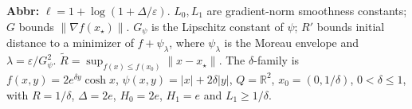 \begin{table}[tp]
\begin{threeparttable}
\begin{tabularx}{\linewidth}{@{}>{\raggedright\arraybackslash}p{0.20\linewidth}>{\raggedright\arraybackslash}p{0.32\linewidth}>{\raggedright\arraybackslash}p{0.25\linewidth}>{\raggedright\arraybackslash}X@{}}
\bottomrule
\end{tabularx}
\begin{tablenotes}[flushleft]\footnotesize
\item[] \textbf{Abbr:} $\ell=1+\log(1+\Delta/\varepsilon)$. $L_0,L_1$ are gradient-norm smoothness constants; $G$ bounds $\|\nabla f(x_\star)\|$. $G_\psi$ is the Lipschitz constant of $\psi$; $R'$ bounds initial distance to a minimizer of $f+\psi_\lambda$, where $\psi_\lambda$ is the Moreau envelope and $\lambda=\varepsilon/G_\psi^2$. $\widetilde R=\sup_{f(x)\le f(x_0)}\|x-x_\star\|$. The $\delta$-family is $f(x,y)=2e^{\delta y}\cosh x$, $\psi(x,y)=|x|+2\delta|y|$, $Q=\mathbb{R}^2$, $x_0=(0,1/\delta)$, $0<\delta\le1$, with $R=1/\delta$, $\Delta=2e$, $H_0=2e$, $H_1=e$ and $L_1\ge1/\delta$.
\end{tablenotes}
\end{threeparttable}
\end{table}
